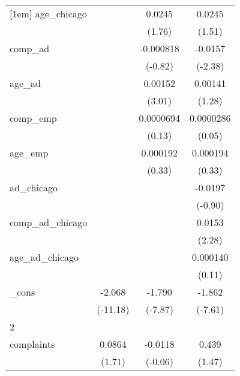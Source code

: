 {\begin{tabular}{l*{3}{c}}
[1em]
age\_chicago &                     &      0.0245         &      0.0245         \\
            &                     &      (1.76)         &      (1.51)         \\
[1em]
comp\_ad     &                     &   -0.000818         &     -0.0157\sym{*}  \\
            &                     &     (-0.82)         &     (-2.38)         \\
[1em]
age\_ad      &                     &     0.00152\sym{**} &     0.00141         \\
            &                     &      (3.01)         &      (1.28)         \\
[1em]
comp\_emp    &                     &   0.0000694         &   0.0000286         \\
            &                     &      (0.13)         &      (0.05)         \\
[1em]
age\_emp     &                     &    0.000192         &    0.000194         \\
            &                     &      (0.33)         &      (0.33)         \\
[1em]
ad\_chicago  &                     &                     &     -0.0197         \\
            &                     &                     &     (-0.90)         \\
[1em]
comp\_ad\_chicago&                     &                     &      0.0153\sym{*}  \\
            &                     &                     &      (2.28)         \\
[1em]
age\_ad\_chicago&                     &                     &    0.000140         \\
            &                     &                     &      (0.11)         \\
[1em]
\_cons      &      -2.068\sym{***}&      -1.790\sym{***}&      -1.862\sym{***}\\
            &    (-11.18)         &     (-7.87)         &     (-7.61)         \\
\hline
2           &                     &                     &                     \\
complaints  &      0.0864         &     -0.0118         &       0.439         \\
            &      (1.71)         &     (-0.06)         &      (1.47)         \\

\end{tabular}}
